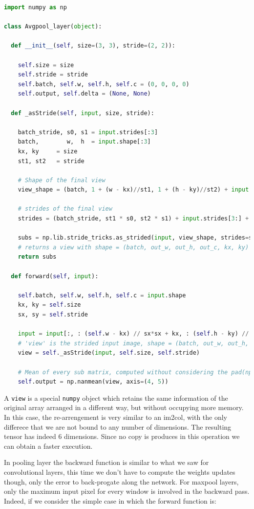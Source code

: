 \documentclass[12pt,a4paper]{report}
\begin{document}
\lstset{style=snippet}
\begin{lstlisting}[language=Python, caption=NumPyNet version of AvgPool function, label=code:py_avgpool]
import numpy as np

class Avgpool_layer(object):

  def __init__(self, size=(3, 3), stride=(2, 2)):

    self.size = size
    self.stride = stride
    self.batch, self.w, self.h, self.c = (0, 0, 0, 0)
    self.output, self.delta = (None, None)

  def _asStride(self, input, size, stride):

    batch_stride, s0, s1 = input.strides[:3]
    batch,        w,  h  = input.shape[:3]
    kx, ky     = size
    st1, st2   = stride

    # Shape of the final view
    view_shape = (batch, 1 + (w - kx)//st1, 1 + (h - ky)//st2) + input.shape[3:] + (kx, ky)

    # strides of the final view
    strides = (batch_stride, st1 * s0, st2 * s1) + input.strides[3:] + (s0, s1)

    subs = np.lib.stride_tricks.as_strided(input, view_shape, strides=strides)
    # returns a view with shape = (batch, out_w, out_h, out_c, kx, ky)
    return subs

  def forward(self, input):

    self.batch, self.w, self.h, self.c = input.shape
    kx, ky = self.size
    sx, sy = self.stride

    input = input[:, : (self.w - kx) // sx*sx + kx, : (self.h - ky) // sy*sy + ky, ...]
    # 'view' is the strided input image, shape = (batch, out_w, out_h, out_c, kx, ky)
    view = self._asStride(input, self.size, self.stride)

    # Mean of every sub matrix, computed without considering the pad(np.nan)
    self.output = np.nanmean(view, axis=(4, 5))

\end{lstlisting}

A \texttt{view} is a special \texttt{numpy} object which retains the same information of the original array arranged in a different way, but without occupying more memory. In this case, the re-arrengement is very similar to an im2col, with the only differece that we are not bound to any number of dimensions. The resulting tensor has indeed 6 dimensions.
Since no copy is produces in this operation we can obtain a faster execution.

In pooling layer the backward function is similar to what we saw for convolutional layers, this time we don't have to compute the weights updates though, only the error to back-progate along the network.
For maxpool layers, only the maximum input pixel for every window is involved in the backward pass. Indeed, if we consider the simple case in which the forward function is: 
\end{document}
